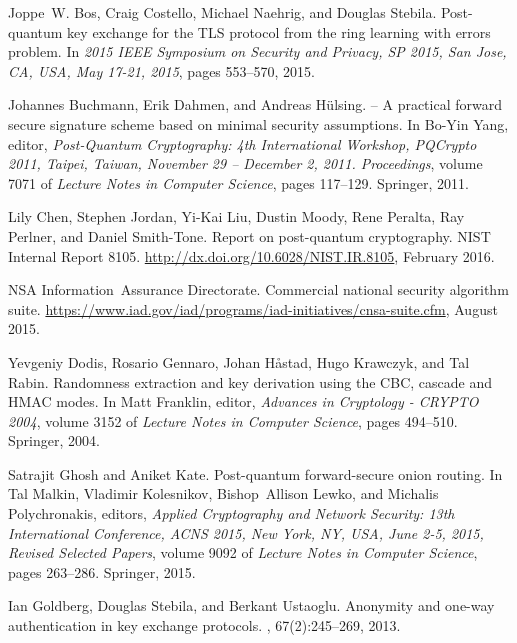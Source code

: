 \documentclass[USenglish,oneside,twocolumn]{article}
\theoremstyle{dgthm}
\theoremstyle{dgdef}
\begin{document}
\begin{thebibliography}{10}
Joppe~W. Bos, Craig Costello, Michael Naehrig, and Douglas Stebila.
\newblock Post-quantum key exchange for the {TLS} protocol from the ring
  learning with errors problem.
\newblock In {\em 2015 {IEEE} Symposium on Security and Privacy, {SP} 2015, San
  Jose, CA, USA, May 17-21, 2015}, pages 553--570, 2015.

Johannes Buchmann, Erik Dahmen, and Andreas H\"ulsing.
 -- {A} practical forward secure signature scheme based on
  minimal security assumptions.
\newblock In Bo-Yin Yang, editor, {\em Post-{Quantum} {Cryptography}: 4th
  International Workshop, PQCrypto 2011, Taipei, Taiwan, November 29 --
  December 2, 2011. Proceedings}, volume 7071 of {\em Lecture {Notes} in
  {Computer} {Science}}, pages 117--129. Springer, 2011.

Lily Chen, Stephen Jordan, Yi-Kai Liu, Dustin Moody, Rene Peralta, Ray Perlner,
  and Daniel Smith-Tone.
\newblock Report on post-quantum cryptography.
\newblock NIST Internal Report 8105.
  \url{http://dx.doi.org/10.6028/NIST.IR.8105}, February 2016.

NSA Information~Assurance Directorate.
\newblock Commercial national security algorithm suite.
\newblock
  \url{https://www.iad.gov/iad/programs/iad-initiatives/cnsa-suite.cfm}, August
  2015.

Yevgeniy Dodis, Rosario Gennaro, Johan H{\aa}stad, Hugo Krawczyk, and Tal
  Rabin.
\newblock Randomness extraction and key derivation using the {CBC}, cascade and
  {HMAC} modes.
\newblock In Matt Franklin, editor, {\em Advances in {Cryptology} - {CRYPTO}
  2004}, volume 3152 of {\em Lecture {Notes} in {Computer} {Science}}, pages
  494--510. Springer, 2004.

Satrajit Ghosh and Aniket Kate.
\newblock Post-quantum forward-secure onion routing.
\newblock In Tal Malkin, Vladimir Kolesnikov, Bishop~Allison Lewko, and
  Michalis Polychronakis, editors, {\em Applied Cryptography and Network
  Security: 13th International Conference, ACNS 2015, New York, NY, USA, June
  2-5, 2015, Revised Selected Papers}, volume 9092 of {\em Lecture {Notes} in
  {Computer} {Science}}, pages 263--286. Springer, 2015.

Ian Goldberg, Douglas Stebila, and Berkant Ustaoglu.
\newblock Anonymity and one-way authentication in key exchange protocols.
, 67(2):245--269, 2013.


\end{thebibliography}
\end{document}
